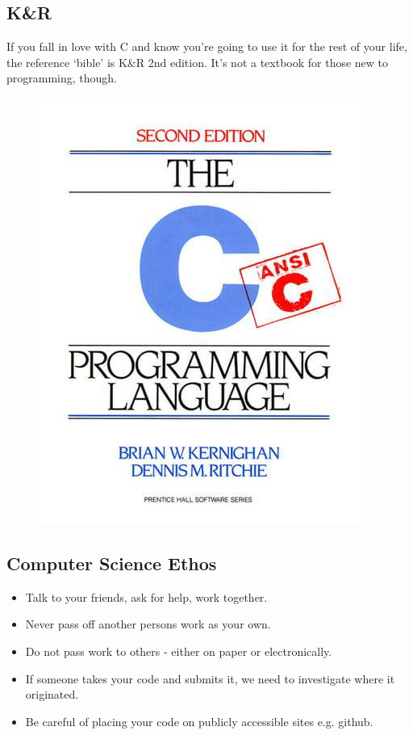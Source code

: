 \documentclass[a4,portraitt]{slides}
\begin{document}
\subsection*{K\&R}
If you fall in love with C and  know you're going to use it for the rest of your life, the reference `bible' is K\&R 2nd edition.
It's not a textbook for those new to programming, though.
\begin{figure}[h]
\centerline{
\includegraphics[scale=0.65]{../Figs/9780131103627.jpg}
}
\end{figure}

\newpage
\subsection*{Computer Science Ethos}
\begin{itemize}
\item Talk to your friends, ask for help, work together.
\item Never pass off another persons work as your own.
\item Do not pass work to others - either on paper or
electronically.
\item If someone takes your code and submits it, we need to investigate where it originated.
\item Be careful of placing your code on publicly accessible sites e.g. github.
\end{itemize}
\end{document}
